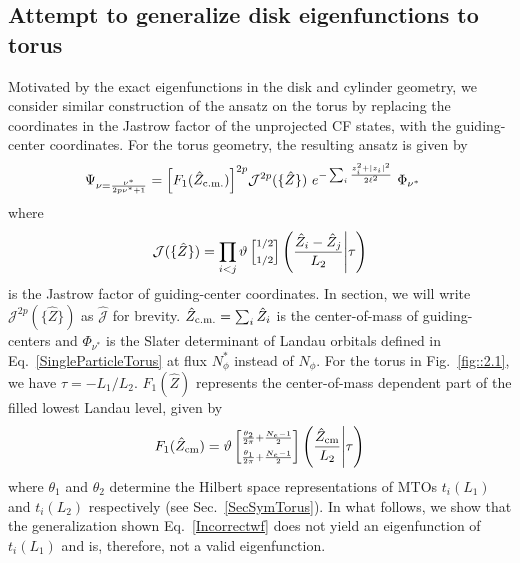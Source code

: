 \documentclass[prb,aps,epsfig,longbibliography,twocolumn]{revtex4-1}
\newcommand{\sbkt}[1]{\left[ #1\right]}
\newcommand{\np}{N_{\phi}}
\newcommand{\jbkt}[2]{\left( #1 \middle| #2\right)}
\newcommand{\rtheta}[4]{\vartheta \sbkt{ \substack{{#1} \\ \\{#2}}}	\jbkt{#3}{#4}}
\begin{document}
\subsection{Attempt to generalize disk eigenfunctions to torus} \label{IncorrectAnsatz}
Motivated by the exact eigenfunctions in the disk and cylinder geometry, we consider similar construction of the ansatz on the torus by replacing the coordinates in the Jastrow factor of the unprojected CF states,\cite{Pu2017,PeriodicLaughlin} with the guiding-center coordinates. For the torus geometry, the resulting ansatz is given by
\begin{align}
\Psi_{\nu=\frac{\nu^*}{2p\nu^*+1}}=\left[F_1(\hat{Z}_{\rm c.m.}) \right]^{2p}& {\mathcal{J}}^{2p}(\{\hat{Z}\})\  e^{-\sum_i\frac{ z^2_i+|z_i|^2 }{2\ell^2}}\ \Phi_{\nu^*} \label{Incorrectwf}
\end{align}
where
\begin{equation}
{\mathcal{J}}(\{\hat{Z}\}) = \prod_{i<j}\rtheta{1/2}{1/2}{{\hat{Z}_i-\hat{Z}_j\over L_2}}{\tau}
\end{equation} 
is the Jastrow factor of guiding-center coordinates. In section, we will write ${\mathcal{J}}^{2p}(\{\hat{Z}\})$ as $\hat{\mathcal{J}}$ for brevity. $\hat{Z}_{\rm c.m.}=\sum_{i}{\hat{Z}_i}$ is the center-of-mass of guiding-centers and $\Phi_{\nu^*}$ is the Slater determinant of Landau orbitals defined in  Eq.~\eqref{SingleParticleTorus} at flux $\np^*$ instead of $\np $. For the torus in Fig.~\ref{fig::2.1}, we have $\tau = -{L_1}/{L_2}$. $F_1(\hat{Z})$ represents the center-of-mass dependent part of the filled lowest Landau level,\cite{PeriodicLaughlin}  given by
\begin{equation}
\label{FZ}
F_1(\hat{Z}_{\rm cm})=\rtheta{\frac{\theta_2}{2\pi} + \frac{{N_e}-1}{2}}{\frac{\theta_1}{2\pi} + \frac{{N_e}-1}{2} }{\frac{\hat{Z}_{\rm cm}}{L_2}}{ \tau}
\end{equation}
where $\theta_1$ and $\theta_2$ determine  the Hilbert space representations of MTOs $t_i(L_1)$ and $t_i(L_2)$ respectively (see Sec.~\ref{SecSymTorus}). In what follows, we show that the generalization shown Eq.~\eqref{Incorrectwf}  does not yield an eigenfunction of $t_i(L_1)$ and is, therefore, not a valid eigenfunction.
\end{document}
